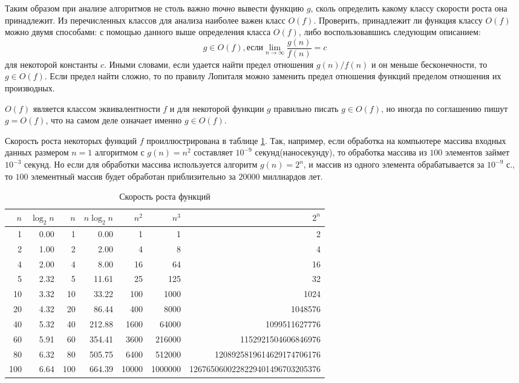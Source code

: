 Таким образом при анализе алгоритмов не столь важно \emph{точно} вывести функцию $g$, сколь определить какому классу скорости роста она принадлежит. Из перечисленных классов для анализа наиболее важен класс $O(f)$. Проверить, принадлежит ли функция классу $O(f)$ можно двумя способами: с помощью данного выше определения класса $O(f)$, либо воспользовавшись следующим описанием:
\[
    g\in O(f),\text{если} \lim_{n\to\infty}\frac{g(n)}{f(n)}=c
\]
для некоторой константы $c$. Иными словами, если удается найти предел отношения $g(n)/f(n)$ и он меньше бесконечности, то $g\in O(f)$. Если предел найти сложно, то по правилу Лопиталя можно заменить предел отношения функций пределом отношения их производных.

$O(f)$ является классом эквивалентности $f$ и для некоторой функции $g$ правильно писать $g\in O(f)$, но иногда по соглашению пишут $g=O(f)$, что на самом деле означает именно $g\in O(f)$.

Скорость роста некоторых функций $f$ проиллюстрирована в таблице \ref{alg:tbl:gorwth}. Так, например, если обработка на компьютере массива входных данных размером $n=1$ алгоритмом с $g(n)=n^2$ составляет $10^{-9}$ секунд(наносекунду), то обработка массива из $100$ элементов займет $10^{-3}$ секунд. Но если для обработки массива используется алгоритм $g(n)=2^n$, и массив из одного элемента обрабатывается за $10^{-9}$ с., то $100$ элементный массив будет обработан приблизительно за $20000$ миллиардов лет.
\begin{table}
    \centering
    \begin{tabular}{||r||r|r|r|r|r|r|}
        \hline\hline
        $n$ & $\log_2n$ & $n$ & $n\log_2n$ & $n^2$ & $n^3$ & $2^n$\\ \hline\hline
          1 & 0.00 &   1 &    0.00 &     1 &       1 &                                 2\\
          2 & 1.00 &   2 &    2.00 &     4 &       8 &                                 4\\
          4 & 2.00 &   4 &    8.00 &    16 &      64 &                                16\\
          5 & 2.32 &   5 &   11.61 &    25 &     125 &                                32\\
         10 & 3.32 &  10 &   33.22 &   100 &    1000 &                              1024\\
         20 & 4.32 &  20 &   86.44 &   400 &    8000 &                           1048576\\
         40 & 5.32 &  40 &  212.88 &  1600 &   64000 &                     1099511627776\\
         60 & 5.91 &  60 &  354.41 &  3600 &  216000 &               1152921504606846976\\
         80 & 6.32 &  80 &  505.75 &  6400 &  512000 &         1208925819614629174706176\\
        100 & 6.64 & 100 &  664.39 & 10000 & 1000000 &   1267650600228229401496703205376\\
        \hline
    \end{tabular} 
    \caption{Скорость роста функций}
    \label{alg:tbl:gorwth}
\end{table}

